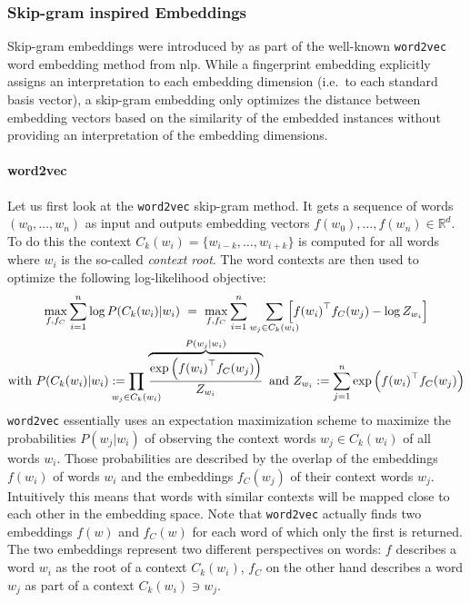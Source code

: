 \subsubsection{Skip-gram inspired Embeddings}

Skip-gram embeddings were introduced by \citeauthor{Mikolov2013} as part of the well-known \texttt{word2vec}~\cite{Mikolov2013} word embedding method from \ac{nlp}.
While a fingerprint embedding explicitly assigns an interpretation to each embedding dimension (i.e.\ to each standard basis vector), a skip-gram embedding only optimizes the distance between embedding vectors based on the similarity of the embedded instances without providing an interpretation of the embedding dimensions.

\paragraph{word2vec}
Let us first look at the \texttt{word2vec} skip-gram method.
It gets a sequence of words $(w_0, \dots, w_n)$ as input and outputs embedding vectors $f(w_0), \dots, f(w_n) \in \mathbb{R}^d$.
To do this the context $C_k(w_i) = \{ w_{i-k}, \dots, w_{i + k} \}$ is computed for all words where $w_i$ is the so-called \textit{context root}.
The word contexts are then used to optimize the following log-likelihood objective:
\begin{gather}
	\max_{f, f_C} \sum_{i = 1}^n \log P(C_k(w_i) | w_i)\ =\ \max_{f, f_C} \sum_{i = 1}^n \smashoperator[r]{\sum_{w_j \in C_k(w_i)}}\, \left[ {f(w_i)}^\top f_C(w_j) - \log Z_{w_i} \right] \label{eq:related:gcr:embed:word2vec}\\
	\text{with } P(C_k(w_i) | w_i) := \prod_{\mathclap{w_j \in C_k(w_i)}}\, \overbrace{\frac{\exp\left({f(w_i)}^\top f_C(w_j)\right)}{Z_{w_i}}}^{P(w_j | w_i)}
	\text{ and } Z_{w_i} := \sum_{j = 1}^n \exp\left({f(w_i)}^\top f_C(w_j)\right) \nonumber
\end{gather}
\texttt{word2vec} essentially uses an expectation maximization scheme to maximize the probabilities $P(w_j | w_i)$ of observing the context words $w_j \in C_k(w_i)$ of all words $w_i$.
Those probabilities are described by the overlap of the embeddings $f(w_i)$ of words $w_i$ and the embeddings $f_C(w_j)$ of their context words $w_j$.
Intuitively this means that words with similar contexts will be mapped close to each other in the embedding space.
Note that \texttt{word2vec} actually finds two embeddings $f(w)$ and $f_C(w)$ for each word of which only the first is returned.
The two embeddings represent two different perspectives on words: $f$ describes a word $w_i$ as the root of a context $C_k(w_i)$, $f_C$ on the other hand describes a word $w_j$ as part of a context $C_k(w_i) \ni w_j$.

